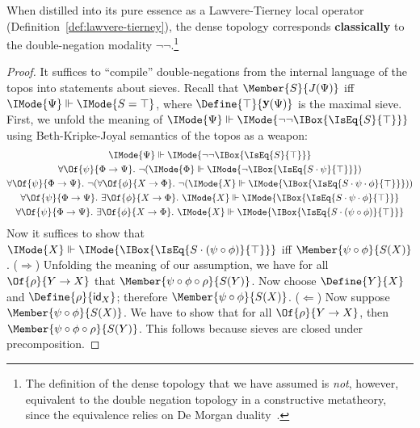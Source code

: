 \documentclass{article}
\DeclareMathOperator\OpYoneda{\mathbf{y}}
\newcommand\Yoneda[1]{\OpYoneda({#1})}
\newcommand\ArrId[1]{\mathsf{id}_{#1}}
\newcommand\Forces[2]{\IMode{#1}\Vdash\IMode{#2}}
\begin{document}
\begin{lem}
  When distilled into its pure essence as a Lawvere-Tierney local
  operator (Definition~\ref{def:lawvere-tierney}), the dense topology
  corresponds \textbf{classically} to the double-negation modality
  $\lnot\lnot$.\footnote{The definition of the dense topology that we
    have assumed is \emph{not}, however, equivalent to the double
    negation topology in a constructive metatheory, since the
    equivalence relies on De Morgan
    duality~\cite{spitters:2010,coquand:2013}.}
\end{lem}
\begin{proof}
  It suffices to ``compile'' double-negations from the internal
  language of the topos into statements about sieves. Recall that
  $\Member{S}{J(\Psi)}$ iff $\Forces{\Psi}{S=\top}$, where
  $\Define{\top}{\Yoneda{\Psi}}$ is the maximal sieve. First, we
  unfold the meaning of
  $\Forces{\Psi}{\lnot\lnot\IBox{\IsEq{S}{\top}}}$ using
  Beth-Kripke-Joyal semantics of the topos as a weapon:
  \begin{gather}
    \Forces{\Psi}{\lnot\lnot\IBox{\IsEq{S}{\top}}}
    \\
    \forall\Of{\psi}{\Phi\to\Psi}.\
    \lnot(\Forces{\Phi}{\lnot\IBox{\IsEq{S\cdot\psi}{\top}}})
    \\
    \forall\Of{\psi}{\Phi\to\Psi}.\
    \lnot(
      \forall\Of{\phi}{X\to\Phi}.\
      \lnot(\Forces{X}{\IBox{\IsEq{S\cdot\psi\cdot\phi}{\top}}})
    )
    \label{de-morgan-1}
    \\
    \forall\Of{\psi}{\Phi\to\Psi}.\
    \exists\Of{\phi}{X\to \Phi}.\
    \Forces{X}{\IBox{\IsEq{S\cdot\psi\cdot\phi}{\top}}}
    \label{de-morgan-2}
    \\
    \forall\Of{\psi}{\Phi\to\Psi}.\
    \exists\Of{\phi}{X\to \Phi}.\
    \Forces{X}{\IBox{\IsEq{S\cdot(\psi\circ\phi)}{\top}}}
  \end{gather}
  Now it suffices to show that
  $\Forces{X}{\IBox{\IsEq{S\cdot(\psi\circ\phi)}{\top}}}$ iff
  $\Member{\psi\circ\phi}{S(X)}$.
  ($\Rightarrow$) Unfolding the meaning of our assumption, we have for
  all $\Of{\rho}{Y\to X}$ that
  $\Member{\psi\circ\phi\circ\rho}{S(Y)}$. Now choose $\Define{Y}{X}$
  and $\Define{\rho}{\ArrId{X}}$; therefore
  $\Member{\psi\circ\phi}{S(X)}$.
  ($\Leftarrow$) Now suppose $\Member{\psi\circ\phi}{S(X)}$. We have
  to show that for all $\Of{\rho}{Y\to X}$, then
  $\Member{\psi\circ\phi\circ\rho}{S(Y)}$. This follows because sieves
  are closed under precomposition.
\end{proof}
\end{document}
